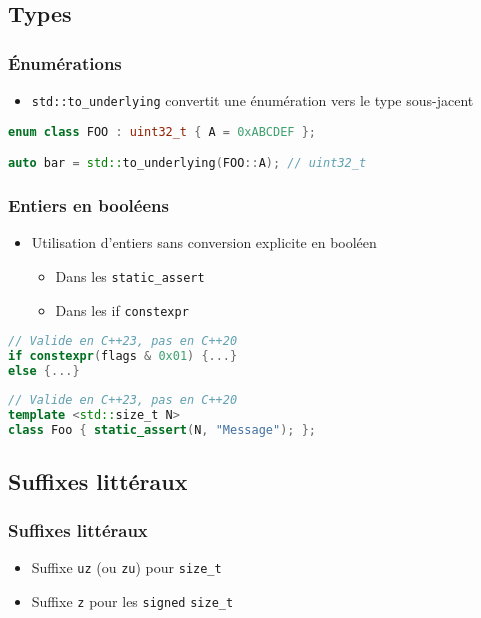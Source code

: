 \documentclass[C++.tex]{subfiles}
\begin{document}
\subsection*{Types}
\begin{frame}[fragile]
	\frametitle{Énumérations}
	\begin{itemize}
		\item \lstinline|std::to_underlying| convertit une énumération vers le type sous-jacent

	\end{itemize}

	\begin{lstlisting}[language=C++]
enum class FOO : uint32_t { A = 0xABCDEF };

auto bar = std::to_underlying(FOO::A); // uint32_t\end{lstlisting}
\end{frame}

\begin{frame}[fragile]
	\frametitle{Entiers en booléens}
	\begin{itemize}
		\item Utilisation d'entiers sans conversion explicite en booléen
		\begin{itemize}
			\item Dans les \lstinline|static_assert|
			\item Dans les if \lstinline|constexpr|
		\end{itemize}
	\end{itemize}

	\begin{lstlisting}[language=C++]
// Valide en C++23, pas en C++20
if constexpr(flags & 0x01) {...}
else {...}\end{lstlisting}

	\begin{lstlisting}[language=C++]
// Valide en C++23, pas en C++20
template <std::size_t N>
class Foo {	static_assert(N, "Message"); };\end{lstlisting}
\end{frame}

\subsection*{Suffixes littéraux}
\begin{frame}[fragile]
	\frametitle{Suffixes littéraux}
	\begin{itemize}
		\item Suffixe \lstinline|uz| (ou \lstinline|zu|) pour \lstinline|size_t|
		\item Suffixe \lstinline|z| pour les \og \lstinline|signed|\fg{} \lstinline|size_t|

	\end{itemize}
\end{frame}
\end{document}
